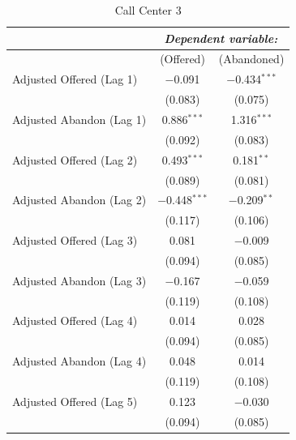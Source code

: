 \documentclass[manuscript,screen,authorversion]{acmart}
\begin{document}
\begin{table}[!htbp]
\centering
\caption{Call Center 3}
\label{tbl-call-center-3}
\small
\renewcommand{\arraystretch}{0.88}
\setlength{\tabcolsep}{3.5pt}

\begin{tabularx}{0.92\linewidth}{@{\extracolsep{\fill}}>{\raggedright\arraybackslash}Xcc}
\hline\hline
 & \multicolumn{2}{c}{\textit{Dependent variable:}} \\
\cline{2-3}
 & (Offered) & (Abandoned) \\
\hline

Adjusted Offered (Lag 1)  & $-$0.091 & $-$0.434$^{***}$ \\
 & {\scriptsize (0.083)} & {\scriptsize (0.075)} \\

Adjusted Abandon (Lag 1)  & 0.886$^{***}$ & 1.316$^{***}$ \\
 & {\scriptsize (0.092)} & {\scriptsize (0.083)} \\

Adjusted Offered (Lag 2)  & 0.493$^{***}$ & 0.181$^{**}$ \\
 & {\scriptsize (0.089)} & {\scriptsize (0.081)} \\

Adjusted Abandon (Lag 2)  & $-$0.448$^{***}$ & $-$0.209$^{**}$ \\
 & {\scriptsize (0.117)} & {\scriptsize (0.106)} \\

Adjusted Offered (Lag 3)  & 0.081 & $-$0.009 \\
 & {\scriptsize (0.094)} & {\scriptsize (0.085)} \\

Adjusted Abandon (Lag 3)  & $-$0.167 & $-$0.059 \\
 & {\scriptsize (0.119)} & {\scriptsize (0.108)} \\

Adjusted Offered (Lag 4)  & 0.014 & 0.028 \\
 & {\scriptsize (0.094)} & {\scriptsize (0.085)} \\

Adjusted Abandon (Lag 4)  & 0.048 & 0.014 \\
 & {\scriptsize (0.119)} & {\scriptsize (0.108)} \\

Adjusted Offered (Lag 5)  & 0.123 & $-$0.030 \\
 & {\scriptsize (0.094)} & {\scriptsize (0.085)} \\


\end{tabularx}
\end{table}
\end{document}
